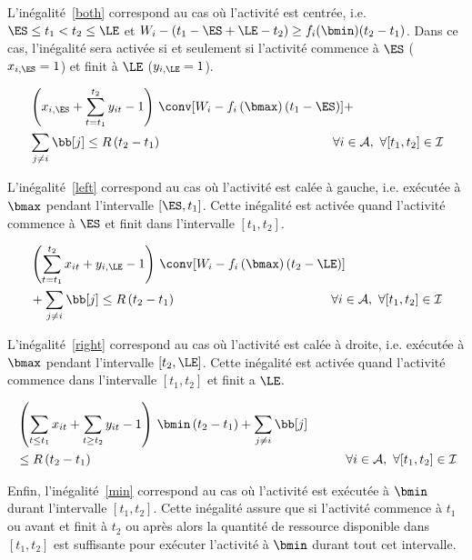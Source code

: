 L'inégalité~\eqref{both} correspond au cas où l'activité est centrée,
i.e. $\ES\le t_1<t_2 \le \LE$ et $W_i-\left(t_1-\ES + \LE -t_2\right)
\ge f_i(\bmin)(t_2-t_1)$. Dans ce cas, l'inégalité sera activée si et
seulement si l'activité commence à $\ES$ ($x_{i,\ES}=1$) et finit à
$\LE$ ($y_{i,\LE}=1$). 

\begin{align}
&\left(x_{i,\ES} + \sum_{t=t_1}^{t_2}y_{it} -1\right) \,
\conv[W_i-f_i\left(\bmax\right)\left(t_1-\ES\right)]+ \nonumber\\
&\sum_{j\neq i} \bb[j] \le R\left(t_2-t_1\right) \hspace{4.75cm} \forall i \in
  {\cal A},\ \forall [t_1,t_2] \in \I
\label{left}
\end{align}

L'inégalité~\eqref{left} correspond au cas où l'activité est calée à
gauche, i.e. exécutée à $\bmax$ pendant l'intervalle
$[\ES,t_1]$. Cette inégalité est activée quand l'activité commence à
$\ES$ et finit dans l'intervalle $[t_1,t_2]$. 

\begin{align}
&\left(\sum_{t=t_1}^{t_2}x_{it} + y_{i,\LE}-1\right) \,
\conv[W_i-f_i\left(\bmax\right)\left(t_2-\LE\right)]\nonumber\\
& + \sum_{j\neq i} \bb[j] \le R\left(t_2-t_1\right) \hspace{4.29cm} \forall i \in
{\cal A},\ \forall [t_1,t_2] \in \I
\label{right}
\end{align} 

L'inégalité~\eqref{right} correspond au cas où l'activité est calée à
droite, i.e. exécutée à $\bmax$ pendant l'intervalle
$[t_2,\LE]$. Cette inégalité est activée quand l'activité commence
dans l'intervalle $[t_1,t_2]$ et finit a $\LE$.

\begin{align}
&\left(\sum_{t\le t_1}x_{it} + \sum_{t\ge t_2}y_{it} -1 \right) \,
  \bmin\left(t_2-t_1\right) + \sum_{j\neq i} \bb[j] \nonumber\\
& \le R\left(t_2-t_1\right)\hspace{7cm} \forall i \in {\cal A},\ \forall [t_1,t_2]
\in \I
\label{min}
\end{align}

Enfin, l'inégalité~\eqref{min} correspond au cas où l'activité est
exécutée à $\bmin$ durant l'intervalle $[t_1,t_2]$. Cette inégalité
assure que si l'activité commence à $t_1$ ou avant et finit à $t_2$ ou
après alors la quantité de ressource disponible dans $[t_1,t_2]$ est
suffisante pour exécuter l'activité à $\bmin$ durant tout cet
intervalle.


